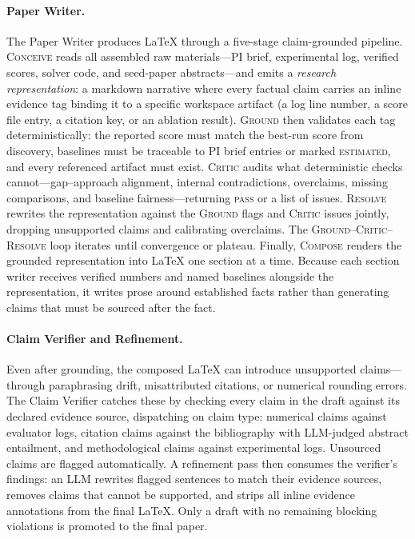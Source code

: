 \paragraph{Paper Writer.}
\label{sec:paper_writer}
\label{sec:system:writer}

The Paper Writer produces \LaTeX{} through a five-stage claim-grounded pipeline.
\textsc{Conceive} reads all assembled raw materials---PI brief, experimental log, verified scores, solver code, and seed-paper abstracts---and emits a \emph{research representation}: a markdown narrative where every factual claim carries an inline evidence tag binding it to a specific workspace artifact (a log line number, a score file entry, a citation key, or an ablation result).
\textsc{Ground} then validates each tag deterministically: the reported score must match the best-run score from discovery, baselines must be traceable to PI brief entries or marked \textsc{estimated}, and every referenced artifact must exist.
\textsc{Critic} audits what deterministic checks cannot---gap--approach alignment, internal contradictions, overclaims, missing comparisons, and baseline fairness---returning \textsc{pass} or a list of issues.
\textsc{Resolve} rewrites the representation against the \textsc{Ground} flags and \textsc{Critic} issues jointly, dropping unsupported claims and calibrating overclaims. The \textsc{Ground}--\textsc{Critic}--\textsc{Resolve} loop iterates until convergence or plateau.
Finally, \textsc{Compose} renders the grounded representation into \LaTeX{} one section at a time. Because each section writer receives verified numbers and named baselines alongside the representation, it writes prose around established facts rather than generating claims that must be sourced after the fact.

\paragraph{Claim Verifier and Refinement.}
\label{sec:claim_verifier}
\label{sec:system:verifier}

Even after grounding, the composed \LaTeX{} can introduce unsupported claims---through paraphrasing drift, misattributed citations, or numerical rounding errors.
The Claim Verifier catches these by checking every claim in the draft against its declared evidence source, dispatching on claim type: numerical claims against evaluator logs, citation claims against the bibliography with LLM-judged abstract entailment, and methodological claims against experimental logs.
Unsourced claims are flagged automatically.
A refinement pass then consumes the verifier's findings: an LLM rewrites flagged sentences to match their evidence sources, removes claims that cannot be supported, and strips all inline evidence annotations from the final \LaTeX{}.
Only a draft with no remaining blocking violations is promoted to the final paper.
